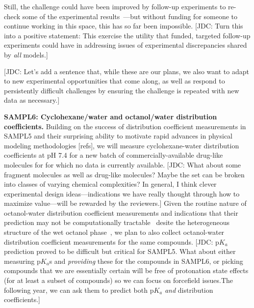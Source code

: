 \documentclass[11pt]{article}
\begin{document}
Still, the challenge could have been improved by follow-up experiments to re-check some of the experimental results~\cite{paranahewage_predicting_2016, klamt_prediction_2016, bannan_blind_2016, rustenburg_measuring_2016}---but without funding for someone to continue working in this space, this has so far been impossible.
{\color{red}[JDC: Turn this into a positive statement: This exercise the utility that funded, targeted follow-up experiments could have in addressing issues of experimental discrepancies shared by \emph{all} models.]}

{\color{red}[JDC: Let's add a sentence that, while these are our plans, we also want to adapt to new experimental opportunities that come along, as well as respond to persistently difficult challenges by ensuring the challenge is repeated with new data as necessary.]}

{\bf SAMPL6: Cyclohexane/water and octanol/water distribution coefficients.}
Building on the success of distribution coefficient measurements in SAMPL5 and their surprising ability to motivate rapid advances in physical modeling methodologies [refs], we will measure cyclohexane-water distribution coefficients at pH 7.4 for a new batch of commercially-available drug-like molecules for for which no data is currently available.
{\color{red}[JDC: What about some fragment molecules as well as drug-like molecules? Maybe the set can be broken into classes of varying chemical complexities? In general, I think clever experimental design ideas---indications we have really thought through how to maximize value---will be rewarded by the reviewers.]}
Given the routine nature of octanol-water distribution coefficient measurements and indications that their prediction may not be computationally tractable~\cite{Bhatnagar:2013:PhysicalChemistryChemicalPhysics,bannan_calculating_2016} desite the heterogeneous structure of the wet octanol phase~\cite{Kollman:1996:AccountsofChemicalResearch}, we plan to also collect octanol-water distribution coefficient measurements for the same compounds.
{\color{red}[JDC: p$K_a$ prediction proved to be difficult but critical for SAMPL5. What about either measuring p$K_a$s and \emph{providing} these for the compounds in SAMPL6, or picking compounds that we are essentially certain will be free of protonation state effects (for at least a subset of compounds) so we can focus on forcefield issues.The following year, we can ask them to predict both p$K_a$ \emph{and} distribution coefficients.]}
\end{document}
